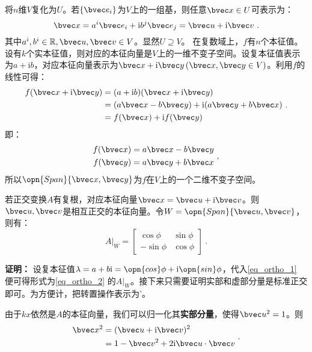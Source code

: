 将$n$维$V$复化为$U$。若$\{\bvec e_i\}$为$V$上的一组基，则任意$\bvec x\in U$可表示为：
\begin{equation}
\bvec x=a^i\bvec e_i+\mathrm i b^j\bvec e_j=\bvec u+\mathrm i\bvec v~.
\end{equation}
其中$a^i,b^i\in \mathbb R,\bvec u,\bvec v\in V$。显然$U\supseteq V$。
在复数域上，$f$有$n$个本征值。设有$k$个实本征值，则对应的本征向量是$V$上的一维不变子空间。设复本征值表示为$a+\mathrm ib$，对应本征向量表示为$\bvec x+\mathrm i \bvec y\,(\bvec x,\bvec y\in V)$。利用$f$的线性可得：
\begin{equation}
\begin{aligned}
f(\bvec x+\mathrm i \bvec y)&=(a+\mathrm i b)(\bvec x+\mathrm i \bvec y)\\
&=(a\bvec x-b\bvec y)+\mathrm i(a\bvec y+b\bvec x)\\
&=f(\bvec x)+\mathrm if(\bvec y)
\end{aligned}~.
\end{equation}
即：
\begin{equation}\label{eq_ortho_1}
\begin{aligned}
f(\bvec x)&=a\bvec x-b\bvec y\\
f(\bvec y)&=a\bvec y+b\bvec x
\end{aligned}~,
\end{equation}
所以$\opn{Span}\{\bvec x,\bvec y\}$为$f$在$V$上的一个二维不变子空间。
\begin{lemma}{}\label{lem_ortho_3}
若正交变换$A$有复根，对应本征向量$\bvec x=\bvec u+\mathrm i\bvec v$。则$\bvec u,\bvec v$是相互正交的本征向量。令$W=\opn{Span}\{\bvec u,\bvec v\}$，则有：
\begin{equation}\label{eq_ortho_2}
A|_W=\left[\begin{array}{rr}
\cos \phi & \sin \phi \\
-\sin \phi & \cos \phi
\end{array}\right]~.
\end{equation}
\end{lemma}
\textbf{证明：}
设复本征值$\lambda=a+b\mathrm i=\opn{cos}\phi+\mathrm i \opn{sin}\phi$，代入\autoref{eq_ortho_1} 便可得形式为\autoref{eq_ortho_2} 的$A|_W$。接下来只需要证明实部和虚部分量是标准正交即可。为方便计，把转置操作表示为'。

由于$kx$依然是$A$的本征向量，我们可以归一化其\textbf{实部分量}，使得$\bvec u^2=1$。则
\begin{equation}\label{eq_ortho_3}
\begin{aligned}
\bvec x^2&=(\bvec u+\mathrm i\bvec v)^2\\
&=1-\bvec v^2+2\mathrm i \bvec u\cdot\bvec v
\end{aligned}~.
\end{equation}

